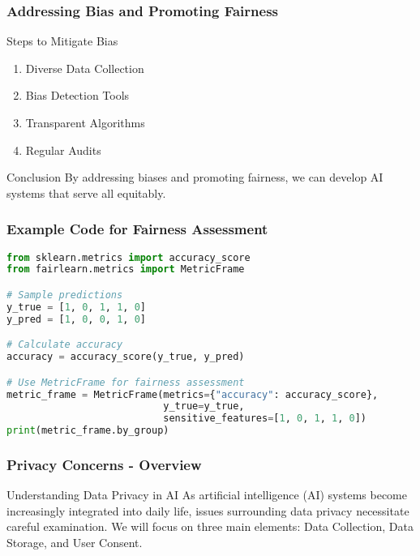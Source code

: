 \documentclass[aspectratio=169]{beamer}
\begin{document}
\begin{frame}[fragile]
    \frametitle{Addressing Bias and Promoting Fairness}
    \begin{block}{Steps to Mitigate Bias}
        \begin{enumerate}
            \item Diverse Data Collection
            \item Bias Detection Tools
            \item Transparent Algorithms
            \item Regular Audits
        \end{enumerate}
    \end{block}
    \begin{block}{Conclusion}
        By addressing biases and promoting fairness, we can develop AI systems that serve all equitably.
    \end{block}
\end{frame}

\begin{frame}[fragile]
    \frametitle{Example Code for Fairness Assessment}
    \begin{lstlisting}[language=Python]
from sklearn.metrics import accuracy_score
from fairlearn.metrics import MetricFrame

# Sample predictions
y_true = [1, 0, 1, 1, 0]
y_pred = [1, 0, 0, 1, 0]

# Calculate accuracy
accuracy = accuracy_score(y_true, y_pred)

# Use MetricFrame for fairness assessment
metric_frame = MetricFrame(metrics={"accuracy": accuracy_score},
                           y_true=y_true,
                           sensitive_features=[1, 0, 1, 1, 0])
print(metric_frame.by_group)
    \end{lstlisting}
\end{frame}

\begin{frame}[fragile]
    \frametitle{Privacy Concerns - Overview}
    \begin{block}{Understanding Data Privacy in AI}
        As artificial intelligence (AI) systems become increasingly integrated into daily life, issues surrounding data privacy necessitate careful examination. 
        We will focus on three main elements: Data Collection, Data Storage, and User Consent.
    \end{block}
\end{frame}
\end{document}
